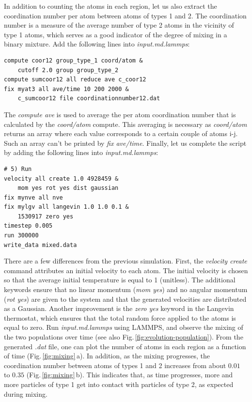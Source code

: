 \documentclass[9pt,tutorial]{livecoms}
\begin{document}
In addition to counting the atoms in each region, let us also extract the coordination number per atom between atoms of types 1 and 2. The coordination number is a measure of the average number of type 2 atoms in the vicinity of type 1 atoms, which serves as a good indicator of the degree of mixing in a binary mixture. Add the following lines into \textit{input.md.lammps}:
{\normalsize \begin{verbatim}
compute coor12 group_type_1 coord/atom &
    cutoff 2.0 group group_type_2
compute sumcoor12 all reduce ave c_coor12
fix myat3 all ave/time 10 200 2000 &
    c_sumcoor12 file coordinationnumber12.dat
\end{verbatim}}
The \textit{compute ave} is used to average the per atom coordination number that is calculated by the \textit{coord/atom} compute. This averaging is necessary as \textit{coord/atom} returns an array where each value corresponds to a certain couple of atoms i-j. Such an array can't be printed by \textit{fix ave/time}. Finally, let us complete the script by adding the following lines into \textit{input.md.lammps}:
{\normalsize \begin{verbatim}
# 5) Run
velocity all create 1.0 4928459 &
    mom yes rot yes dist gaussian
fix mynve all nve
fix mylgv all langevin 1.0 1.0 0.1 &
    1530917 zero yes
timestep 0.005
run 300000
write_data mixed.data
\end{verbatim}}
There are a few differences from the previous simulation. First, the \textit{velocity create} command attributes an initial velocity to each atom. The initial velocity is chosen so that the average initial temperature is equal to 1 (unitless). The additional keywords ensure that no linear momentum (\textit{mom yes}) and no angular momentum (\textit{rot yes}) are given to the system and that the generated velocities are distributed as a Gaussian. Another improvement is the \textit{zero yes} keyword in the Langevin thermostat, which ensures that the total random force applied to the atoms is equal to zero. Run \textit{input.md.lammps} using LAMMPS, and observe the mixing of the two populations over time (see also Fig.\,\ref{fig:evolution-population}). From the generated \textit{.dat} file, one can plot the number of atoms in each region as a function of time (Fig.\,\ref{fig:mixing}\,a). In addition, as the mixing progresses, the coordination number between atoms of types 1 and 2 increases from about $0.01$ to $0.35$ (Fig.\,\ref{fig:mixing}\,b). This indicates that, as time progresses, more and more particles of type 1 get into contact with particles of type 2, as expected during mixing.
\end{document}
